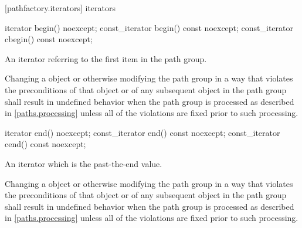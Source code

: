  [pathfactory.iterators] { iterators}
    
\begin{itemdecl}
	iterator begin() noexcept;
	const_iterator begin() const noexcept;
	const_iterator cbegin() const noexcept;
\end{itemdecl}
\begin{itemdescr}
	\pnum
	\returns
	An iterator referring to the first  item in the path group.
	
	\pnum
	\remarks
	Changing a  object or otherwise modifying the path group in a way that violates the preconditions of that  object or of any subsequent  object in the path group shall result in undefined behavior when the path group is processed as described in \ref{paths.processing} unless all of the violations are fixed prior to such processing.
\end{itemdescr}

\begin{itemdecl}
	iterator end() noexcept;
	const_iterator end() const noexcept;
	const_iterator cend() const noexcept;
\end{itemdecl}
\begin{itemdescr}
	\pnum
	\returns
	An iterator which is the past-the-end value.
	
	\pnum
	\remarks
	Changing a  object or otherwise modifying the path group in a way that violates the preconditions of that  object or of any subsequent  object in the path group shall result in undefined behavior when the path group is processed as described in \ref{paths.processing} unless all of the violations are fixed prior to such processing.
\end{itemdescr}

